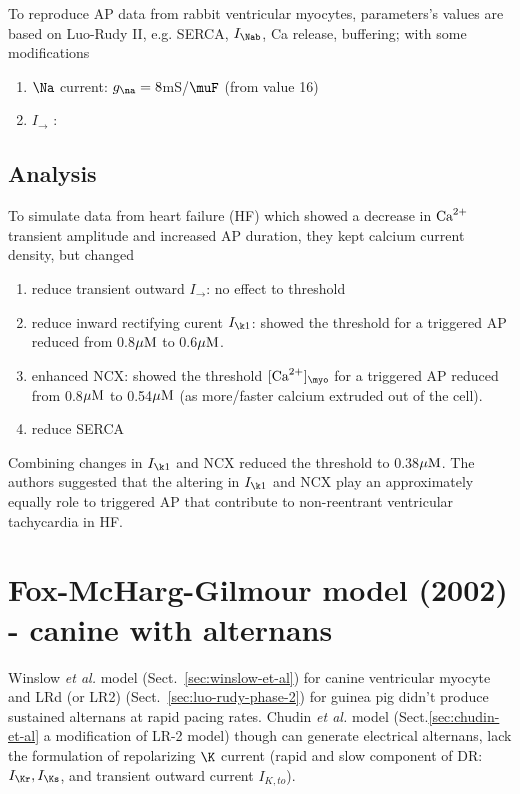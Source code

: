 To reproduce AP data from rabbit ventricular myocytes, parameters's values are
based on Luo-Rudy II, e.g. SERCA, $I_\Nab$, Ca release, buffering; with some
modifications
\begin{enumerate}
  \item $\Na$ current: $g_\na=8$mS/$\muF$ (from value 16)
  \item $I_\to$ :
\end{enumerate}

\subsection{Analysis}

To simulate data from heart failure (HF) which showed a decrease in ${\text{Ca}^{2+}}$
transient amplitude and increased AP duration, they kept calcium current
density, but changed
\begin{enumerate}
  \item reduce transient outward $I_\to$: no effect to threshold

  \item reduce inward rectifying curent $I_{\k1}$: showed the threshold for a
  triggered AP reduced from 0.8${\mu\text{M}}$ to 0.6${\mu\text{M}}$.
  \item enhanced NCX: showed the threshold $[\Ca]_\myo$ for a triggered
  AP reduced from 0.8${\mu\text{M}}$ to 0.54${\mu\text{M}}$ (as more/faster calcium extruded out
  of the cell).
  \item reduce SERCA
\end{enumerate}
Combining changes in $I_{\k1}$ and NCX reduced the threshold to 0.38${\mu\text{M}}$. The
authors suggested that the altering in $I_{\k1}$ and NCX play an
approximately equally role to triggered AP that contribute to
non-reentrant ventricular tachycardia in HF.






\section{Fox-McHarg-Gilmour model (2002) - canine with alternans}
\label{sec:fox-mcharg-gilmour}

Winslow {\it et al.} model (Sect.~\ref{sec:winslow-et-al}) for canine
ventricular myocyte and LRd (or LR2) (Sect.~\ref{sec:luo-rudy-phase-2}) for
guinea pig didn't produce sustained alternans at rapid pacing rates. Chudin {\it
et al.} model (Sect.\ref{sec:chudin-et-al} a modification of LR-2 model) though
can generate electrical alternans, lack the formulation of repolarizing $\K$
current (rapid and slow component of DR:$I_\Kr,I_\Ks$, and transient outward
current $I_{K,to}$).

